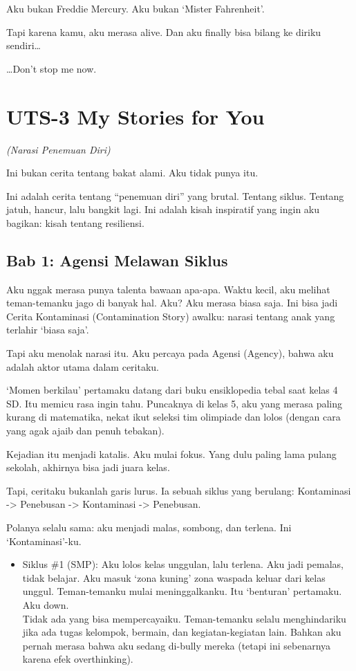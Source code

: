 \documentclass[
  letterpaper,
  DIV=11,
  numbers=noendperiod]{scrreprt}
\providecommand{\tightlist}{%
  \setlength{\itemsep}{0pt}\setlength{\parskip}{0pt}}
\begin{document}
Aku bukan Freddie Mercury. Aku bukan `Mister Fahrenheit'.

Tapi karena kamu, aku merasa alive. Dan aku finally bisa bilang ke
diriku sendiri\ldots{}

\ldots Don't stop me now.


\chapter{UTS-3 My Stories for You}\label{uts-3-my-stories-for-you}

\emph{(Narasi Penemuan Diri)}

Ini bukan cerita tentang bakat alami. Aku tidak punya itu.

Ini adalah cerita tentang ``penemuan diri'' yang brutal. Tentang siklus.
Tentang jatuh, hancur, lalu bangkit lagi. Ini adalah kisah inspiratif
yang ingin aku bagikan: kisah tentang resiliensi.

\section{\texorpdfstring{\textbf{Bab 1: Agensi Melawan
Siklus}}{Bab 1: Agensi Melawan Siklus}}\label{bab-1-agensi-melawan-siklus}

Aku nggak merasa punya talenta bawaan apa-apa. Waktu kecil, aku melihat
teman-temanku jago di banyak hal. Aku? Aku merasa biasa saja. Ini bisa
jadi Cerita Kontaminasi (Contamination Story) awalku: narasi tentang
anak yang terlahir `biasa saja'.

Tapi aku menolak narasi itu. Aku percaya pada Agensi (Agency), bahwa aku
adalah aktor utama dalam ceritaku.

`Momen berkilau' pertamaku datang dari buku ensiklopedia tebal saat
kelas 4 SD. Itu memicu rasa ingin tahu. Puncaknya di kelas 5, aku yang
merasa paling kurang di matematika, nekat ikut seleksi tim olimpiade dan
lolos (dengan cara yang agak ajaib dan penuh tebakan).

Kejadian itu menjadi katalis. Aku mulai fokus. Yang dulu paling lama
pulang sekolah, akhirnya bisa jadi juara kelas.

Tapi, ceritaku bukanlah garis lurus. Ia sebuah siklus yang berulang:
Kontaminasi -\textgreater{} Penebusan -\textgreater{} Kontaminasi
-\textgreater{} Penebusan.

Polanya selalu sama: aku menjadi malas, sombong, dan terlena. Ini
`Kontaminasi'-ku.

\begin{itemize}
\tightlist
\item
  Siklus \#1 (SMP): Aku lolos kelas unggulan, lalu terlena. Aku jadi
  pemalas, tidak belajar. Aku masuk `zona kuning' zona waspada keluar
  dari kelas unggul. Teman-temanku mulai meninggalkanku. Itu `benturan'
  pertamaku. Aku down.\\
  Tidak ada yang bisa mempercayaiku. Teman-temanku selalu menghindariku
  jika ada tugas kelompok, bermain, dan kegiatan-kegiatan lain. Bahkan
  aku pernah merasa bahwa aku sedang di-bully mereka (tetapi ini
  sebenarnya karena efek overthinking).
\end{itemize}
\end{document}
